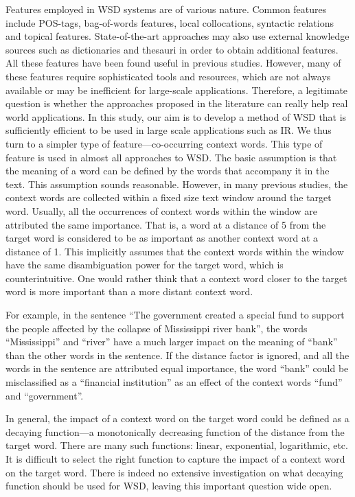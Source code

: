 \documentclass[english]{jnlp_1.4}
\begin{document}
Features employed in WSD systems are of various nature. Common features
include POS-tags, bag-of-words features, local collocations, syntactic
relations and topical features. State-of-the-art approaches may also
use external knowledge sources such as dictionaries and thesauri in
order to obtain additional features. All these features have been
found useful in previous studies. However, many of these features
require sophisticated tools and resources, which are not always available
or may be inefficient for large-scale applications. Therefore, a legitimate
question is whether the approaches proposed in the literature can
really help real world applications. In this study, our aim is to
develop a method of WSD that is sufficiently efficient to be used
in large scale applications such as IR. We thus turn to a simpler
type of feature---co-occurring context words. This type
of feature is used in almost all approaches to WSD. The basic assumption
is that the meaning of a word can be defined by the words that accompany
it in the text. This assumption sounds reasonable. However, in many
previous studies, the context words are collected within a fixed size
text window around the target word. Usually, all the occurrences of
context words within the window are attributed the same importance.
That is, a word at a distance of 5 from the target word is considered
to be as important as another context word at a distance of 1. This
implicitly assumes that the context words within the window have the
same disambiguation power for the target word, which is counterintuitive.
One would rather think that a context word closer to the target word
is more important than a more distant context word.

For example, in the sentence \textquotedblleft{}The government created
a special fund to support the people affected by the collapse of Mississippi
river bank\textquotedblright{}, the words \textquotedblleft{}Mississippi\textquotedblright{}
and \textquotedblleft{}river\textquotedblright{} have a much larger
impact on the meaning of \textquotedblleft{}bank\textquotedblright{}
than the other words in the sentence. If the distance factor is ignored,
and all the words in the sentence are attributed equal importance,
the word \textquotedblleft{}bank\textquotedblright{} could be misclassified
as a \textquotedblleft{}financial institution\textquotedblright{}
as an effect of the context words \textquotedblleft{}fund\textquotedblright{}
and \textquotedblleft{}government\textquotedblright{}.

In general, the impact of a context word on the target word could
be defined as a decaying function---a monotonically decreasing function
of the distance from the target word. There are many such functions:
linear, exponential, logarithmic, etc. It is difficult to select the
right function to capture the impact of a context word on the target
word. There is indeed no extensive investigation on what decaying
function should be used for WSD, leaving this important question wide
open.
\end{document}
